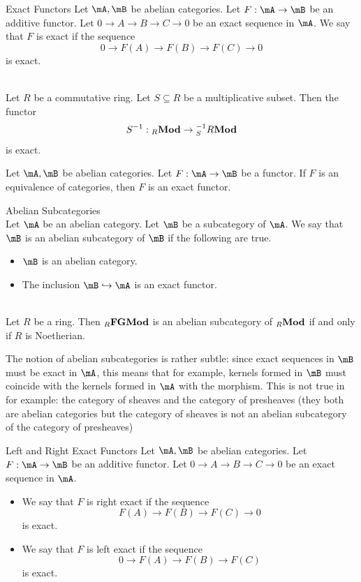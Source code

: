 \documentclass[a4paper]{article}
\begin{document}
\begin{defn}{Exact Functors}{} Let $\mA,\mB$ be abelian categories. Let $F:\mA\to\mB$ be an additive functor. Let $0\to A\to B\to C\to 0$ be an exact sequence in $\mA$. We say that $F$ is exact if the sequence $$0\to F(A)\to F(B)\to F(C)\to 0$$ is exact. 
\end{defn}

\begin{eg}{}{}\\
Let $R$ be a commutative ring. Let $S\subseteq R$ be a multiplicative subset. Then the functor $$S^{-1}:{_R}\bold{Mod}\to{_S^{-1}R}\bold{Mod}$$ is exact. 
\end{eg}

\begin{lmm}{}{} Let $\mA,\mB$ be abelian categories. Let $F:\mA\to\mB$ be a functor. If $F$ is an equivalence of categories, then $F$ is an exact functor. 
\end{lmm}

\begin{defn}{Abelian Subcategories}{}\\
Let $\mA$ be an abelian category. Let $\mB$ be a subcategory of $\mA$. We say that $\mB$ is an abelian subcategory of $\mB$ if the following are true. 
\begin{itemize}
\item $\mB$ is an abelian category. 
\item The inclusion $\mB\hookrightarrow\mA$ is an exact functor. 
\end{itemize}
\end{defn}

\begin{eg}{}{}\\
Let $R$ be a ring. Then ${_R}\bold{FGMod}$ is an abelian subcategory of ${_R}\bold{Mod}$ if and only if $R$ is Noetherian. 
\end{eg}

The notion of abelian subcategories is rather subtle: since exact sequences in $\mB$ must be exact in $\mA$, this means that for example, kernels formed in $\mB$ must coincide with the kernels formed in $\mA$ with the morphism. This is not true in for example: the category of sheaves and the category of presheaves (they both are abelian categories but the category of sheaves is not an abelian subcategory of the category of presheaves)

\begin{defn}{Left and Right Exact Functors}{} Let $\mA,\mB$ be abelian categories. Let $F:\mA\to\mB$ be an additive functor. Let $0\to A\to B\to C\to 0$ be an exact sequence in $\mA$. 
\begin{itemize}
\item We say that $F$ is right exact if the sequence $$F(A)\to F(B)\to F(C)\to 0$$ is exact. 
\item We say that $F$ is left exact if the sequence $$0\to F(A)\to F(B)\to F(C)$$ is exact. 
\end{itemize}
\end{defn}
\end{document}
